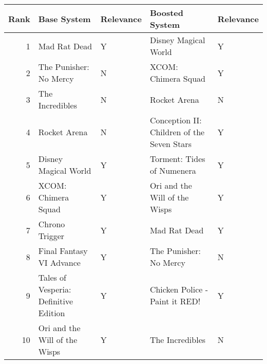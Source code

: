 \begin{tabular}{rllll}
\toprule
Rank & Base System & Relevance & Boosted System & Relevance \\
\midrule
1 & Mad Rat Dead & Y & Disney Magical World & Y \\
2 & The Punisher: No Mercy & N & XCOM: Chimera Squad & Y \\
3 & The Incredibles & N & Rocket Arena & N \\
4 & Rocket Arena & N & Conception II: Children of the Seven Stars & Y \\
5 & Disney Magical World & Y & Torment: Tides of Numenera & Y \\
6 & XCOM: Chimera Squad & Y & Ori and the Will of the Wisps & Y \\
7 & Chrono Trigger & Y & Mad Rat Dead & Y \\
8 & Final Fantasy VI Advance & Y & The Punisher: No Mercy & N \\
9 & Tales of Vesperia: Definitive Edition & Y & Chicken Police - Paint it RED! & Y \\
10 & Ori and the Will of the Wisps & Y & The Incredibles & N \\
\bottomrule
\end{tabular}
